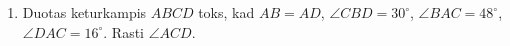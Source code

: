 \begin{enumerate}
\item Duotas keturkampis $ABCD$ toks, kad $AB=AD$, $\angle CBD=30^\circ$,
  $\angle BAC=48^\circ$, $\angle DAC=16^\circ$. Rasti $\angle ACD$.

\end{enumerate}
